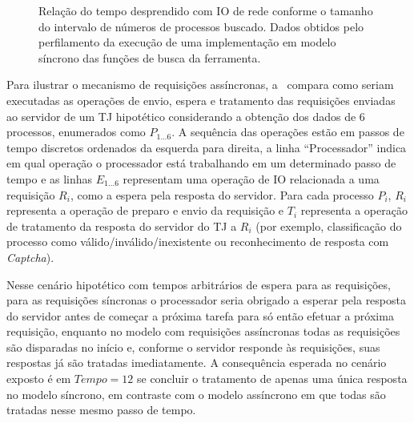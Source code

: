 \begin{figure}[htb]
    \centering
    \caption{%
        Relação do tempo desprendido com IO de rede conforme o tamanho do
        intervalo de números de processos buscado. Dados obtidos pelo
        perfilamento da execução de uma implementação em modelo síncrono das
        funções de busca da ferramenta.
    }
    \label{gra:tempo-io-por-num-processos}
\end{figure}

Para ilustrar o mecanismo de requisições assíncronas,
a~ compara como seriam executadas as
operações de envio, espera e tratamento das requisições enviadas ao servidor de
um TJ hipotético considerando a obtenção dos dados de 6 processos, enumerados
como $P_{1...6}$. A sequência das operações estão em passos de tempo discretos
ordenados da esquerda para direita, a linha ``Processador'' indica em qual
operação o processador está trabalhando em um determinado passo de tempo e as
linhas $E_{1...6}$ representam uma operação de IO relacionada a uma requisição
$R_i$, como a espera pela resposta do servidor.
%
Para cada processo $P_i$, $R_i$ representa a operação de preparo e envio da
requisição e $T_i$ representa a operação de tratamento da resposta do servidor
do TJ a $R_i$ (por exemplo, classificação do processo como
válido/inválido/inexistente ou reconhecimento de resposta com
\textit{Captcha}).


Nesse cenário hipotético com tempos arbitrários de espera para as requisições,
para as requisições síncronas o processador seria obrigado a esperar pela
resposta do servidor antes de começar a próxima tarefa para só então efetuar a
próxima requisição, enquanto no modelo com requisições assíncronas todas as
requisições são disparadas no início e, conforme o servidor responde às
requisições, suas respostas já são tratadas imediatamente. A consequência
esperada no cenário exposto é em $Tempo = 12$ se concluir o tratamento de
apenas uma única resposta no modelo síncrono, em contraste com o modelo
assíncrono em que todas são tratadas nesse mesmo passo de tempo.

